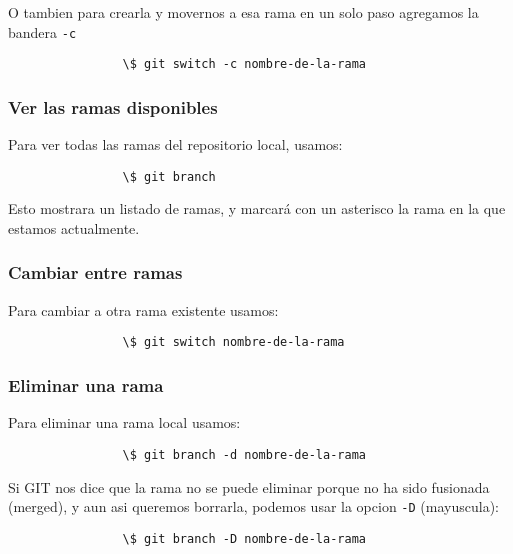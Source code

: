            O tambien para crearla y movernos a esa rama en un solo paso agregamos la bandera \texttt{-c}
            \begin{lstlisting}
                \$ git switch -c nombre-de-la-rama
            \end{lstlisting}

        \subsubsection{Ver las ramas disponibles}
            Para ver todas las ramas del repositorio local, usamos:
            \begin{lstlisting}
                \$ git branch
            \end{lstlisting}

            Esto mostrara un listado de ramas, y marcar\'a con un asterisco la rama en la que estamos actualmente.

        \subsubsection{Cambiar entre ramas}
            Para cambiar a otra rama existente usamos:
            \begin{lstlisting}
                \$ git switch nombre-de-la-rama
            \end{lstlisting}
            
        \subsubsection{Eliminar una rama}
            Para eliminar una rama local usamos:
            \begin{lstlisting}
                \$ git branch -d nombre-de-la-rama
            \end{lstlisting}

            Si GIT nos dice que la rama no se puede eliminar porque no ha sido fusionada (merged), y aun asi queremos borrarla, podemos usar la opcion \texttt{-D} (mayuscula):
            \begin{lstlisting}
                \$ git branch -D nombre-de-la-rama
            \end{lstlisting}